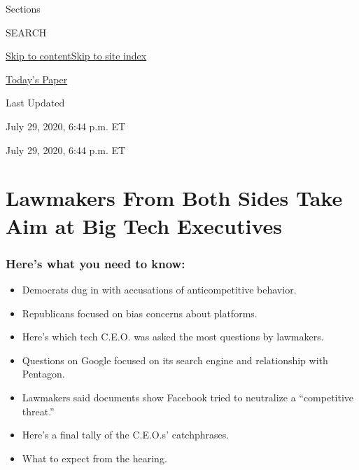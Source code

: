 Sections

SEARCH

\protect\hyperlink{site-content}{Skip to
content}\protect\hyperlink{site-index}{Skip to site index}

\href{https://myaccount.nytimes.com/auth/login?response_type=cookie\&client_id=vi}{}

\href{https://www.nytimes.com/section/todayspaper}{Today's Paper}

Last Updated

July 29, 2020, 6:44 p.m. ET

July 29, 2020, 6:44 p.m. ET

\hypertarget{lawmakers-from-both-sides-take-aim-at-big-tech-executives}{%
\section{Lawmakers From Both Sides Take Aim at Big Tech
Executives}\label{lawmakers-from-both-sides-take-aim-at-big-tech-executives}}

\hypertarget{heres-what-you-need-to-know}{%
\subsubsection{Here's what you need to
know:}\label{heres-what-you-need-to-know}}

\begin{itemize}
\item
  \protect\hyperlink{democrats-dug-in-with-accusations-of-anticompetitive-behavior}{}

  Democrats dug in with accusations of anticompetitive behavior.
\item
  \protect\hyperlink{republicans-focused-on-bias-concerns-about-platforms}{}

  Republicans focused on bias concerns about platforms.
\item
  \protect\hyperlink{heres-which-tech-ceo-was-asked-the-most-questions-by-lawmakers}{}

  Here's which tech C.E.O. was asked the most questions by lawmakers.
\item
  \protect\hyperlink{questions-on-google-focused-on-its-search-engine-and-relationship-with-pentagon}{}

  Questions on Google focused on its search engine and relationship with
  Pentagon.
\item
  \protect\hyperlink{lawmakers-said-documents-show-facebook-tried-to-neutralize-a-competitive-threat}{}

  Lawmakers said documents show Facebook tried to neutralize a
  ``competitive threat.''
\item
  \protect\hyperlink{what-ceos-said}{}

  Here's a final tally of the C.E.O.s' catchphrases.
\item
  \protect\hyperlink{what-to-expect-from-the-hearing}{}

  What to expect from the hearing.
\end{itemize}

